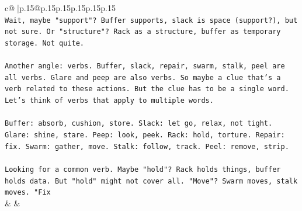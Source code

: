 \documentclass{article}
\begin{document}
{\begin{supertabular}{c@{$\;$}|p{.15\linewidth}@{}p{.15\linewidth}p{.15\linewidth}p{.15\linewidth}p{.15\linewidth}p{.15\linewidth}}
{{{\\ 
\texttt{Wait, maybe "support"? Buffer supports, slack is space (support?), but not sure. Or "structure"? Rack as a structure, buffer as temporary storage. Not quite.} \\
\\ 
\texttt{Another angle: verbs. Buffer, slack, repair, swarm, stalk, peel are all verbs. Glare and peep are also verbs. So maybe a clue that's a verb related to these actions. But the clue has to be a single word. Let's think of verbs that apply to multiple words.} \\
\\ 
\texttt{Buffer: absorb, cushion, store. Slack: let go, relax, not tight. Glare: shine, stare. Peep: look, peek. Rack: hold, torture. Repair: fix. Swarm: gather, move. Stalk: follow, track. Peel: remove, strip.} \\
\\ 
\texttt{Looking for a common verb. Maybe "hold"? Rack holds things, buffer holds data. But "hold" might not cover all. "Move"? Swarm moves, stalk moves. "Fix} \\
            }
        }
    }
    & & \\ \\


\end{supertabular}}
\end{document}
